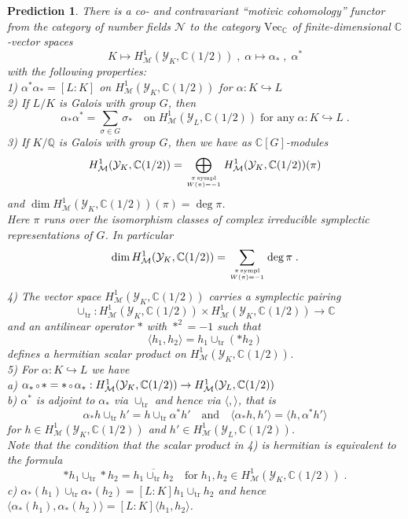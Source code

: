 \documentclass[12pt,leqno]{article}
\newcommand{\C}{{\mathbb{C}}}
\newcommand{\Q}{{\mathbb{Q}}}
\newcommand{\tr}{\mathrm{tr}}
\newcommand{\nVec}{\mathrm{Vec}}
\newcommand{\Mh}{{\mathcal M}}
\newcommand{\Nh}{{\mathcal N}}
\newcommand{\Yh}{\mathcal{Y}}
\newtheorem{prediction}[theorem]{Prediction}
\newcommand{\verk}{\mbox{\scriptsize $\,\circ\,$}}
\begin{document}
\begin{prediction} \label{t2.14} \em 
There is a co- and contravariant ``motivic cohomology'' functor from the category of number fields $\Nh$ to the category $\nVec_{\C}$ of finite-dimensional $\C$-vector spaces
\[
K \longmapsto H^1_{\Mh} (\Yh_K , \C (1/2)) \; , \; \alpha \longmapsto \alpha_* \; , \; \alpha^*
\]
with the following properties:\\
1) $\alpha^* \alpha_* = [L : K]$ on $H^1_{\Mh} (\Yh_K , \C (1/2))$ for $\alpha : K \hookrightarrow L$\\
2) If $L / K$ is Galois with group $G$, then
\[
\alpha_* \alpha^* = \sum_{\sigma \in G} \sigma_* \quad \text{on} \; H^1_{\Mh} (\Yh_L , \C (1/2)) \; \text{for any} \; \alpha : K \hookrightarrow L \; .
\]
3) If $K / \Q$ is Galois with group $G$, then we have as $\C [G]$-modules
\[
H^1_{\Mh} (\Yh_K , \C (1/2)) = \bigoplus_{\pi \, \text{sympl} \atop W (\pi) = -1} H^1_{\Mh} (\Yh_K , \C (1/2)) (\pi)
\]
and $\dim H^1_{\Mh} (\Yh_K , \C (1/2)) (\pi) = \deg \pi$. \\
Here $\pi$ runs over the isomorphism classes of complex irreducible symplectic representations of $G$. In particular
\[
\dim H^1_{\Mh} (\Yh_K , \C (1/2)) = \sum_{\pi \, \text{sympl} \atop W (\pi) = - 1} \deg \pi \; .
\]
4) The vector space $H^1_{\Mh} (\Yh_K  , \C (1/2))$ carries a symplectic pairing
\[
\cup_{\tr} : H^1_{\Mh} (\Yh_K , \C (1/2)) \times H^1_{\Mh} (\Yh_K , \C (1/2)) \longrightarrow \C
\]
and an antilinear operator $*$ with $*^2 = -1$ such that
\[
\langle h_1 , h_2 \rangle = h_1 \cup_{\tr} (* h_2)
\]
defines a hermitian scalar product on $H^1_{\Mh} (\Yh_K , \C (1/2))$. \\
5) For $\alpha : K \hookrightarrow L$ we have\\
a) $\alpha_* \verk * = * \verk \alpha_* : H^1_{\Mh} (\Yh_K , \C (1/2)) \to H^1_{\Mh} (\Yh_L , \C (1/2))$\\
b) $\alpha^*$ is adjoint to $\alpha_*$ via $\cup_{\tr}$ and hence via $\langle , \rangle$, that is
\[
\alpha_* h \cup_{\tr} h' = h \cup_{\tr} \alpha^* h' \quad \text{and} \quad \langle \alpha_* h , h' \rangle = \langle h , \alpha^* h' \rangle
\]
for $h \in H^1_{\Mh} (\Yh_K , \C (1/2))$ and $h' \in H^1_{\Mh} (\Yh_L , \C (1/2))$. \\
Note that the condition that the scalar product in 4) is hermitian is equivalent to the formula
\[
*h_1 \cup_{\tr} *h_2 = \overline{h_1 \cup_{\tr} h_2} \quad \text{for} \; h_1 , h_2 \in H^1_{\Mh} (\Yh_K , \C (1/2)) \; .
\]
c) $\alpha_* (h_1) \cup_{\tr} \alpha_* (h_2) = [L : K] h_1 \cup_{\tr} h_2$ and hence $\langle \alpha_* (h_1) , \alpha_* (h_2) \rangle  = [L : K] \langle h_1 , h_2 \rangle$. \\
\end{prediction}
\end{document}
